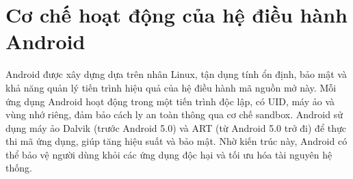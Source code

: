 \section{Cơ chế hoạt động của hệ điều hành Android}

    \hspace*{0.8cm}Android được xây dựng dựa trên nhân Linux, tận dụng tính ổn định, bảo mật và khả năng quản lý tiến trình hiệu quả của hệ điều hành mã nguồn mở này. Mỗi ứng dụng Android hoạt động trong một tiến trình độc lập, có UID, máy ảo và vùng nhớ riêng, đảm bảo cách ly an toàn thông qua cơ chế sandbox. Android sử dụng máy ảo Dalvik (trước Android 5.0) và ART (từ Android 5.0 trở đi) để thực thi mã ứng dụng, giúp tăng hiệu suất và bảo mật. Nhờ kiến trúc này, Android có thể bảo vệ người dùng khỏi các ứng dụng độc hại và tối ưu hóa tài nguyên hệ thống.
\newpage
